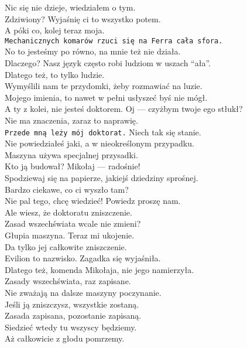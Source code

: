 \chardok{}
Nic się nie dzieje, wiedziałem o tym.\\
Zdziwiony? Wyjaśnię ci to wszystko potem.\\
A póki co, kolej teraz moja.\\
\texttt{Mechanicznych komarów rzuci się na Ferra cała sfora.}\\

\charfer{}
No to jesteśmy po równo, na mnie też nie działa.\\
Dlaczego? Nasz język często robi ludziom w uszach "`ała"'.\\
Dlatego też, to tylko ludzie.\\
Wymyślili nam te przydomki, żeby rozmawiać na luzie.\\
Mojego imienia, to nawet w pełni usłyszeć byś nie mógł.\\
A ty z kolei, nie jesteś doktorem. Oj --- czyżbym twoje ego stłukł?\\

\chardok{}
Nie ma znaczenia, zaraz to naprawię.\\
\texttt{Przede mną leży mój doktorat.} Niech tak się stanie.\\

\charfer{}
Nie powiedziałeś jaki, a w nieokreślonym przypadku.\\
Maszyna używa specjalnej przysadki.\\
Kto ją budował? Mikołaj --- radośnie!\\
Spodziewaj się na papierze, jakiejś dziedziny sprośnej.\\
Bardzo ciekawe, co ci wyszło tam?\\
Nie pal tego, chcę wiedzieć! Powiedz proszę nam.\\
Ale wiesz, że doktoratu zniszczenie.\\
Zasad wszechświata wcale nie zmieni?\\

\charszam{}
Głupia maszyna. Teraz mi ukojenie.\\
Da tylko jej całkowite zniszczenie.\\

\charfer{}
Evilion to nazwisko. Zagadka się wyjaśniła.\\
Dlatego też, komenda Mikołaja, nie jego namierzyła.\\
Zasady wszechświata, raz zapisane.\\
Nie zważają na dalsze maszyny poczynanie.\\
Jeśli ją zniszczysz, wszystkie zostaną.\\
Zasada zapisana, pozostanie zapisaną.\\
Siedzieć wtedy tu wszyscy będziemy.\\
Aż całkowicie z głodu pomrzemy.\\

